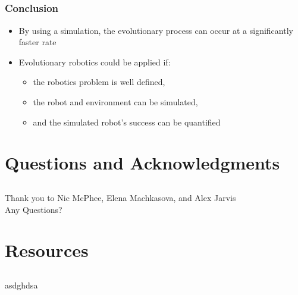 \documentclass{beamer}
\begin{document}
\subsection{}
\begin{frame}
  \frametitle{Conclusion}
  \begin{itemize}
\item By using a simulation, the evolutionary process can occur at a significantly faster rate
\item Evolutionary robotics could be applied if:
 \begin{itemize}
\item the robotics problem is well defined, %
\item the robot and environment can be simulated,
\item and the simulated robot's success can be quantified
\end{itemize}
\end{itemize}
\end{frame}

\section*{Questions and Acknowledgments}
\subsection*{}
\begin{frame}
  \frametitle{}
\begin{center}
Thank you to Nic McPhee, Elena Machkasova, and Alex Jarvis\\
  \large Any Questions? 
\end{center}

\end{frame}

\section*{Resources}
\subsection*{}
\begin{frame}
  \frametitle{}
\begin{center}
  \large asdghdsa 
\end{center}
\end{frame}
\end{document}
